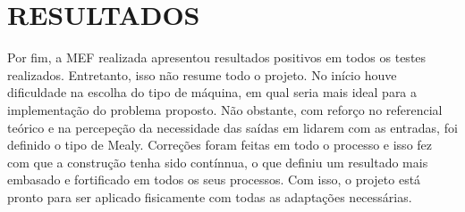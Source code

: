 \chapter{RESULTADOS}
Por fim, a MEF realizada apresentou resultados positivos em todos os testes realizados. Entretanto, isso não resume todo o projeto. No início houve dificuldade na escolha do tipo de máquina, em qual seria mais ideal para a implementação do problema proposto. Não obstante, com reforço no referencial teórico e na percepeção da necessidade das saídas em lidarem com as entradas, foi definido o tipo de Mealy. Correções foram feitas em todo o processo e isso fez com que a construção tenha sido contínnua, o que definiu um resultado mais embasado e fortificado em todos os seus processos. Com isso, o projeto está pronto para ser aplicado fisicamente com todas as adaptações necessárias.